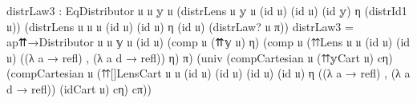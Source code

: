 \documentclass[
  11pt,
  oneside,
  article]{memoir}
\newenvironment{Shaded}{}{}
\newcommand{\NormalTok}[1]{#1}
\newcommand{\OtherTok}[1]{\textcolor[rgb]{0.00,0.44,0.13}{#1}}
\theoremstyle{definition}
\theoremstyle{plain}
\newcommand{\0}{\textsf{0}}
\newcommand{\1}{\tn{\textsf{1}}}
\begin{document}
\begin{Shaded}
\begin{Highlighting}[]
\NormalTok{    distrLaw3 }\OtherTok{:}\NormalTok{ EqDistributor 𝔲 𝔲 𝕪 𝔲 }
                    \OtherTok{(}\NormalTok{distrLens 𝔲 𝕪 𝔲 }\OtherTok{(}\NormalTok{id 𝔲}\OtherTok{)} \OtherTok{(}\NormalTok{id 𝔲}\OtherTok{)} \OtherTok{(}\NormalTok{id 𝕪}\OtherTok{)}\NormalTok{ η }
                               \OtherTok{(}\NormalTok{distrId1 𝔲}\OtherTok{))} 
                    \OtherTok{(}\NormalTok{distrLens 𝔲 𝔲 𝔲 }\OtherTok{(}\NormalTok{id 𝔲}\OtherTok{)} \OtherTok{(}\NormalTok{id 𝔲}\OtherTok{)}\NormalTok{ η }\OtherTok{(}\NormalTok{id 𝔲}\OtherTok{)} 
                               \OtherTok{(}\NormalTok{distrLaw? 𝔲 π}\OtherTok{))}
\NormalTok{    distrLaw3 }\OtherTok{=} 
\NormalTok{        ap⇈→Distributor 𝔲 𝔲 𝕪 𝔲 }\OtherTok{(}\NormalTok{id 𝔲}\OtherTok{)}
            \OtherTok{(}\NormalTok{comp 𝔲 }\OtherTok{(}\NormalTok{⇈𝕪 𝔲}\OtherTok{)}\NormalTok{ η}\OtherTok{)} 
            \OtherTok{(}\NormalTok{comp 𝔲 }\OtherTok{(}\NormalTok{⇈Lens 𝔲 𝔲 }\OtherTok{(}\NormalTok{id 𝔲}\OtherTok{)} \OtherTok{(}\NormalTok{id 𝔲}\OtherTok{)} 
                           \OtherTok{((λ}\NormalTok{ a }\OtherTok{→}\NormalTok{ refl}\OtherTok{)}\NormalTok{ , }\OtherTok{(λ}\NormalTok{ a d }\OtherTok{→}\NormalTok{ refl}\OtherTok{))}\NormalTok{ η}\OtherTok{)}\NormalTok{ π}\OtherTok{)}
            \OtherTok{(}\NormalTok{univ }\OtherTok{(}\NormalTok{compCartesian 𝔲 }\OtherTok{(}\NormalTok{⇈𝕪Cart 𝔲}\OtherTok{)}\NormalTok{ cη}\OtherTok{)} 
                  \OtherTok{(}\NormalTok{compCartesian 𝔲 }
                    \OtherTok{(}\NormalTok{⇈[]LensCart 𝔲 𝔲 }\OtherTok{(}\NormalTok{id 𝔲}\OtherTok{)} \OtherTok{(}\NormalTok{id 𝔲}\OtherTok{)} \OtherTok{(}\NormalTok{id 𝔲}\OtherTok{)} \OtherTok{(}\NormalTok{id 𝔲}\OtherTok{)}\NormalTok{ η }
                                 \OtherTok{((λ}\NormalTok{ a }\OtherTok{→}\NormalTok{ refl}\OtherTok{)}\NormalTok{ , }\OtherTok{(λ}\NormalTok{ a d }\OtherTok{→}\NormalTok{ refl}\OtherTok{))} 
                                 \OtherTok{(}\NormalTok{idCart 𝔲}\OtherTok{)}\NormalTok{ cη}\OtherTok{)} 
\NormalTok{                    cπ}\OtherTok{))}
    

\end{Highlighting}
\end{Shaded}
\end{document}
